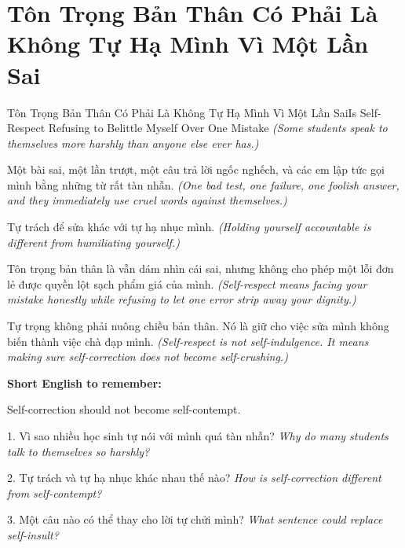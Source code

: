 \section{Tôn Trọng Bản Thân Có Phải Là Không Tự Hạ Mình Vì Một Lần Sai}
\begin{truyen}{Tôn Trọng Bản Thân Có Phải Là Không Tự Hạ Mình Vì Một Lần Sai}{Is Self-Respect Refusing to Belittle Myself Over One Mistake}
\textit{(Some students speak to themselves more harshly than anyone else ever has.)}

Một bài sai, một lần trượt, một câu trả lời ngốc nghếch, và các em lập tức gọi mình bằng những từ rất tàn nhẫn.
\textit{(One bad test, one failure, one foolish answer, and they immediately use cruel words against themselves.)}

Tự trách để sửa khác với tự hạ nhục mình.
\textit{(Holding yourself accountable is different from humiliating yourself.)}

Tôn trọng bản thân là vẫn dám nhìn cái sai, nhưng không cho phép một lỗi đơn lẻ được quyền lột sạch phẩm giá của mình.
\textit{(Self-respect means facing your mistake honestly while refusing to let one error strip away your dignity.)}
\end{truyen}

\begin{baihoc}
Tự trọng không phải nuông chiều bản thân. Nó là giữ cho việc sửa mình không biến thành việc chà đạp mình.
\textit{(Self-respect is not self-indulgence. It means making sure self-correction does not become self-crushing.)}
\end{baihoc}

\begin{ghinhoanh}
\textbf{Short English to remember:}

Self-correction should not become self-contempt.

\end{ghinhoanh}

\begin{tuhocnhanh}
1. Vì sao nhiều học sinh tự nói với mình quá tàn nhẫn? \textit{Why do many students talk to themselves so harshly?}

2. Tự trách và tự hạ nhục khác nhau thế nào? \textit{How is self-correction different from self-contempt?}

3. Một câu nào có thể thay cho lời tự chửi mình? \textit{What sentence could replace self-insult?}
\end{tuhocnhanh}
\ngancach

